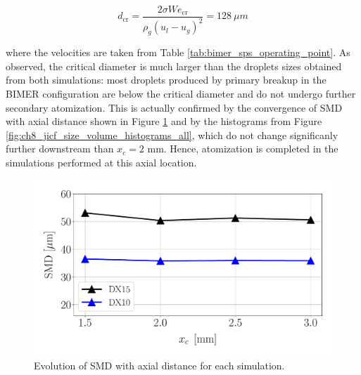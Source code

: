 \begin{equation}
d_\mathrm{cr} = \frac{2 \sigma We_\mathrm{cr}}{\rho_g \left( u_l - u_g \right)^2} = 128 ~\mu m
\end{equation}

where the velocities are taken from Table \ref{tab:bimer_sps_operating_point}. As observed, the critical diameter is much larger than the droplets sizes obtained from both simulations: most droplets produced by primary breakup in the BIMER configuration are below the critical diameter and do not undergo further secondary atomization. This is actually confirmed by the convergence of SMD with axial distance shown in Figure \ref{fig:ch8_spray_char_SMD_final} and by the histograms from Figure \ref{fig:ch8_jicf_size_volume_histograms_all}, which do not change significanly further downstream than $x_c = 2$ mm. Hence, atomization is completed in the simulations performed at this axial location. 






\begin{figure}[ht]
\centering
   \includegraphics[scale=0.35]{./part3_applications/figures_ch8_resolved/SPRAY_characterization/SMD_values}
   \vspace*{-0.2in}
   \caption{Evolution of SMD with axial distance for each simulation.}
   \label{fig:ch8_spray_char_SMD_final}
\end{figure}


\clearpage


